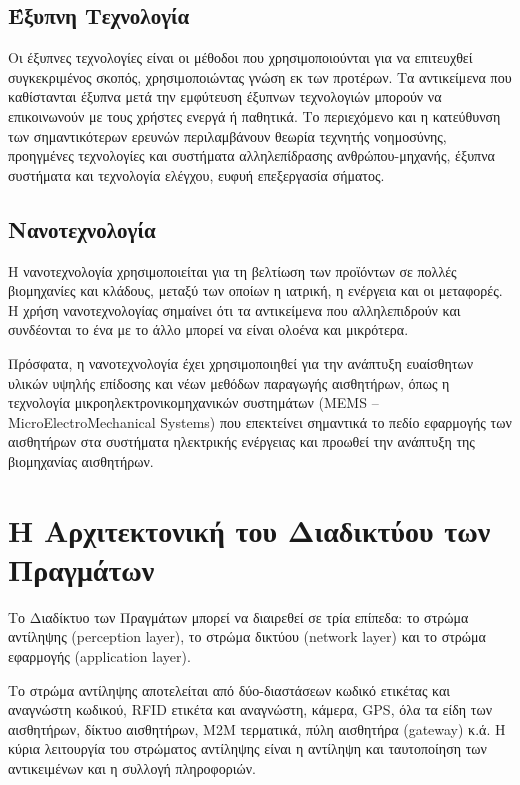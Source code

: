 \documentclass[12pt, a4paper, oneside]{report}
\begin{document}
\subsection{Έξυπνη Τεχνολογία}

Οι έξυπνες τεχνολογίες είναι οι μέθοδοι που χρησιμοποιούνται για να επιτευχθεί συγκεκριμένος σκοπός, χρησιμοποιώντας γνώση εκ των προτέρων. Τα αντικείμενα που καθίστανται έξυπνα μετά την εμφύτευση έξυπνων τεχνολογιών μπορούν να επικοινωνούν με τους χρήστες ενεργά ή παθητικά. Το περιεχόμενο και η κατεύθυνση των σημαντικότερων ερευνών περιλαμβάνουν θεωρία τεχνητής νοημοσύνης, προηγμένες τεχνολογίες και συστήματα αλληλεπίδρασης ανθρώπου-μηχανής, έξυπνα συστήματα και τεχνολογία ελέγχου, ευφυή επεξεργασία σήματος.

\subsection{Νανοτεχνολογία}

Η νανοτεχνολογία χρησιμοποιείται για τη βελτίωση των προϊόντων σε πολλές βιομηχανίες και κλάδους, μεταξύ των οποίων η ιατρική, η ενέργεια και οι μεταφορές. Η χρήση νανοτεχνολογίας σημαίνει ότι τα αντικείμενα που αλληλεπιδρούν και συνδέονται το ένα με το άλλο μπορεί να είναι ολοένα και μικρότερα.

Πρόσφατα, η νανοτεχνολογία έχει χρησιμοποιηθεί για την ανάπτυξη ευαίσθητων υλικών υψηλής επίδοσης και νέων μεθόδων παραγωγής αισθητήρων, όπως η τεχνολογία μικροηλεκτρονικομηχανικών συστημάτων (MEMS – MicroElectroMechanical Systems) που επεκτείνει σημαντικά το πεδίο εφαρμογής των αισθητήρων στα συστήματα ηλεκτρικής ενέργειας και προωθεί την ανάπτυξη της βιομηχανίας αισθητήρων.

\section{Η Αρχιτεκτονική του Διαδικτύου των Πραγμάτων}

Το Διαδίκτυο των Πραγμάτων μπορεί να διαιρεθεί σε τρία επίπεδα: το στρώμα αντίληψης (perception layer), το στρώμα δικτύου (network layer) και το στρώμα εφαρμογής (application layer).

Το στρώμα αντίληψης αποτελείται από δύο-διαστάσεων κωδικό ετικέτας και αναγνώστη κωδικού, RFID ετικέτα και αναγνώστη, κάμερα, GPS, όλα τα είδη των αισθητήρων, δίκτυο αισθητήρων, Μ2Μ τερματικά, πύλη αισθητήρα (gateway) κ.ά. Η κύρια λειτουργία του στρώματος αντίληψης είναι η αντίληψη και ταυτοποίηση των αντικειμένων και η συλλογή πληροφοριών.
\end{document}
